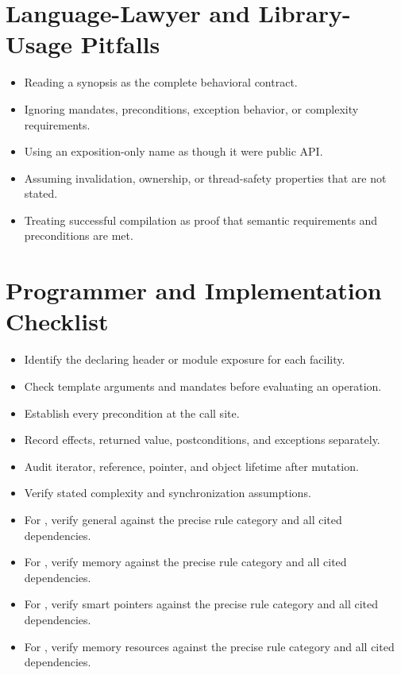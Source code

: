 \documentclass[11pt,letterpaper]{article}
\begin{document}
\section{Language-Lawyer and Library-Usage Pitfalls}
\begin{CornellReferencePitfallBox}\begin{itemize}[label=\textcolor{CornellReferenceAmber}{$\blacktriangleright$}]
\item Reading a synopsis as the complete behavioral contract.
\item Ignoring mandates, preconditions, exception behavior, or complexity requirements.
\item Using an exposition-only name as though it were public API.
\item Assuming invalidation, ownership, or thread-safety properties that are not stated.
\item Treating successful compilation as proof that semantic requirements and preconditions are met.
\end{itemize}\end{CornellReferencePitfallBox}
\section{Programmer and Implementation Checklist}
\begin{CornellReferenceChecklistBox}\begin{itemize}[label=$\square$]
\item Identify the declaring header or module exposure for each facility.
\item Check template arguments and mandates before evaluating an operation.
\item Establish every precondition at the call site.
\item Record effects, returned value, postconditions, and exceptions separately.
\item Audit iterator, reference, pointer, and object lifetime after mutation.
\item Verify stated complexity and synchronization assumptions.
\item For , verify general against the precise rule category and all cited dependencies.
\item For , verify memory against the precise rule category and all cited dependencies.
\item For , verify smart pointers against the precise rule category and all cited dependencies.
\item For , verify memory resources against the precise rule category and all cited dependencies.
\end{itemize}\end{CornellReferenceChecklistBox}
\end{document}
